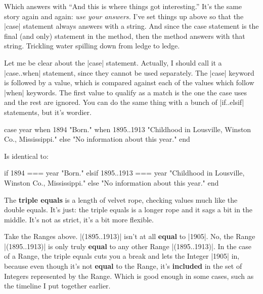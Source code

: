 \documentclass[12pt,twoside]{report}
\begin{document}
Which answers with ``And this is where things got interesting.''  It's
the same story again and again: {\em use your answers.}  I've set
things up above so that the \rubyinline|case|
statement always answers with a string. And since the case statement
is the final (and only) statement in the method, then the method
answers with that string.  Trickling water spilling down from ledge to
ledge.

Let me be clear about the \rubyinline|case| statement.
Actually, I should call it a \rubyinline|case..when|
statement, since they cannot be used separately.  The
\rubyinline|case| keyword is followed by a value,
which is compared against each of the values which follow
\rubyinline|when| keywords.  The first value to
qualify as a match is the one the case uses and the rest are ignored.
You can do the same thing with a bunch of
\rubyinline|if..elsif| statements, but it's wordier.


\begin{rubycode}

 case year
 when 1894
   "Born."
 when 1895..1913
   "Childhood in Lousville, Winston Co., Mississippi."
 else
   "No information about this year."
 end

\end{rubycode}


Is identical to:


\begin{rubycode}

 if 1894 === year
   "Born."
 elsif 1895..1913 === year
   "Childhood in Lousville, Winston Co., Mississippi."
 else
   "No information about this year."
 end

\end{rubycode}


The {\bf triple equals} is a length of velvet rope, checking values
much like the double equals.  It's just: the triple equals is a longer
rope and it sags a bit in the middle.  It's not as strict, it's a bit
more flexible.

Take the Ranges above.  \rubyinline|(1895..1913)|
isn't at all {\bf equal} to \rubyinline|1905|.  No,
the Range \rubyinline|(1895..1913)| is only truly {\bf
  equal} to any other Range \rubyinline|(1895..1913)|.
In the case of a Range, the triple equals cuts you a break and lets
the Integer \rubyinline|1905| in, because even though
it's not {\bf equal} to the Range, it's {\bf included} in the set of
Integers represented by the Range.  Which is good enough in some
cases, such as the timeline I put together earlier.
\end{document}
